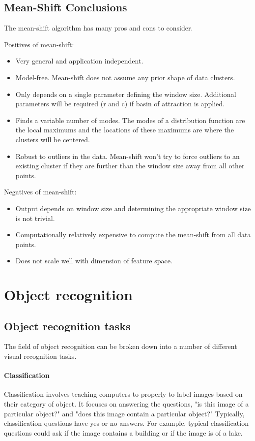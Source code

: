 \documentclass{article}
\begin{document}
\subsection{Mean-Shift Conclusions}

The mean-shift algorithm has many pros and cons to consider.

Positives of mean-shift:
\begin{itemize}
\item Very general and application independent. 
\item Model-free. Mean-shift does not assume any prior shape of data clusters.
\item Only depends on a single parameter defining the window size. Additional parameters will be required (r and c) if basin of attraction is applied.
\item Finds a variable number of modes. The modes of a distribution function are the local maximums and the locations of these maximums are where the clusters will be centered.
\item Robust to outliers in the data. Mean-shift won't try to force outliers to an existing cluster if they are further than the window size away from all other points.
\end{itemize}

Negatives of mean-shift:
\begin{itemize}
\item Output depends on window size and determining the appropriate window size is not trivial.
\item Computationally relatively expensive to compute the mean-shift from all data points.
\item Does not scale well with dimension of feature space.
\end{itemize}

\section{Object recognition}

\subsection{Object recognition tasks}
The field of object recognition can be broken down into a number of different visual recognition tasks. 

\paragraph{Classification} 
Classification involves teaching computers to properly to label images based on their category of object. It focuses on answering the questions, "is this image of a particular object?" and "does this image contain a particular object?" Typically, classification questions have yes or no answers. For example, typical classification questions could ask if the image contains a building or if the image is of a lake.
\end{document}

